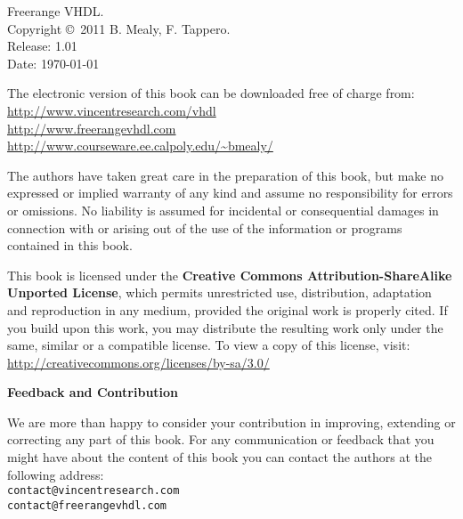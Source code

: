 %
%
%
\setcounter{page}{1}

\small
\noindent
Freerange VHDL.\\
Copyright \copyright \ 2011 B. Mealy, F. Tappero.\\
Release: 1.01\\
Date: \today
\vspace{20pt}

\noindent
The electronic version of this book can be downloaded free of charge from:\\ 
\url{http://www.vincentresearch.com/vhdl}\\
\url{http://www.freerangevhdl.com}\\
\url{http://www.courseware.ee.calpoly.edu/~bmealy/}

\vspace{20pt}

\noindent
The authors have taken great care in the preparation of this book, but make no expressed or implied warranty of any kind and assume no responsibility for errors or omissions. No liability is assumed for incidental or consequential damages in connection with or arising out of the use of the information or programs contained in this book.

\noindent
This book is licensed under the \textbf{Creative Commons Attribution-ShareAlike Unported License}, which permits unrestricted use, distribution, adaptation and reproduction in any medium, provided the original work is properly cited. If you build upon this work, you may distribute the resulting work only under the same, similar or a compatible license. To view a copy of this license, visit:\\
\url{http://creativecommons.org/licenses/by-sa/3.0/}
\vspace{20pt}

\noindent
{\sffamily\bfseries Feedback and Contribution}

\noindent
We are more than happy to consider your contribution in improving, extending or correcting any part of this book.
For any communication or feedback that you might have about the content of this book you can contact the authors at the following address:\\
\texttt{contact@vincentresearch.com}\\
\texttt{contact@freerangevhdl.com}


